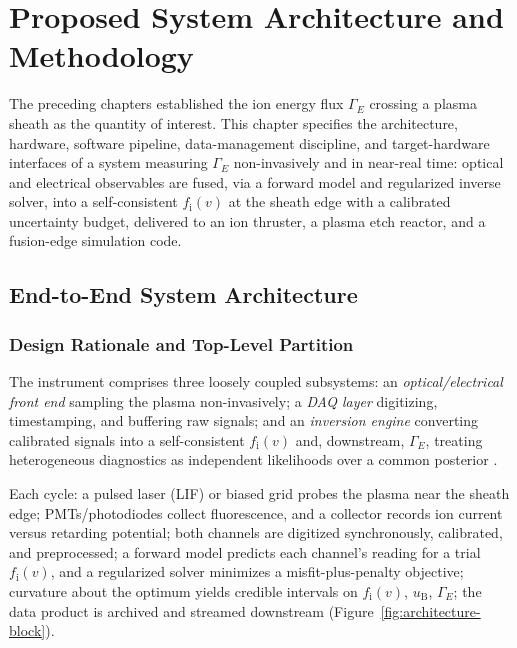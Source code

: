 \chapter{Proposed System Architecture and Methodology}
\label{ch:method}

The preceding chapters established the ion energy flux $\Gamma_{E}$ crossing a plasma sheath as the quantity of interest. This chapter specifies the architecture, hardware, software pipeline, data-management discipline, and target-hardware interfaces of a system measuring $\Gamma_{E}$ non-invasively and in near-real time: optical and electrical observables are fused, via a forward model and regularized inverse solver, into a self-consistent $f_{\mathrm{i}}(v)$ at the sheath edge with a calibrated uncertainty budget, delivered to an ion thruster, a plasma etch reactor, and a fusion-edge simulation code.

\section{End-to-End System Architecture}
\label{sec:method-architecture}

\subsection{Design Rationale and Top-Level Partition}

The instrument comprises three loosely coupled subsystems: an \emph{optical/electrical front end} sampling the plasma non-invasively; a \emph{DAQ layer} digitizing, timestamping, and buffering raw signals; and an \emph{inversion engine} converting calibrated signals into a self-consistent $f_{\mathrm{i}}(v)$ and, downstream, $\Gamma_{E}$, treating heterogeneous diagnostics as independent likelihoods over a common posterior \cite{ref0706,ref0712,ref0711}.

Each cycle: a pulsed laser (LIF) or biased grid probes the plasma near the sheath edge; PMTs/photodiodes collect fluorescence, and a collector records ion current versus retarding potential; both channels are digitized synchronously, calibrated, and preprocessed; a forward model predicts each channel's reading for a trial $f_{\mathrm{i}}(v)$, and a regularized solver minimizes a misfit-plus-penalty objective; curvature about the optimum yields credible intervals on $f_{\mathrm{i}}(v)$, $u_{\mathrm{B}}$, $\Gamma_{E}$; the data product is archived and streamed downstream (Figure~\ref{fig:architecture-block}).

